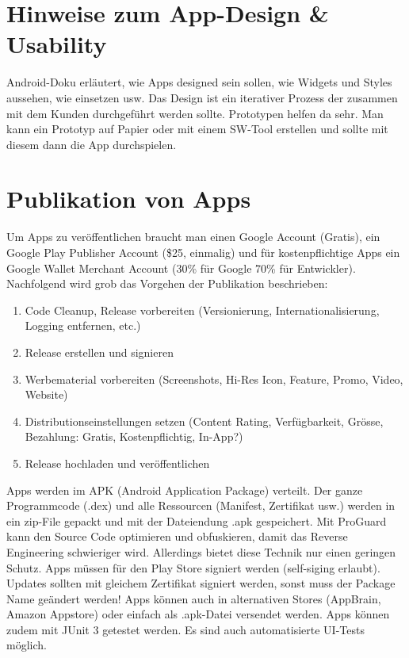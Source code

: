 \section{Hinweise zum App-Design \& Usability}

Android-Doku erläutert, wie Apps designed sein sollen, wie Widgets und Styles aussehen, wie einsetzen usw. Das Design ist ein iterativer Prozess der zusammen mit dem Kunden durchgeführt werden sollte. Prototypen helfen da sehr. Man kann ein Prototyp auf Papier oder mit einem SW-Tool erstellen und sollte mit diesem dann die App durchspielen. 

\section{Publikation von Apps}

Um Apps zu veröffentlichen braucht man einen Google Account (Gratis), ein Google Play Publisher Account (\$25, einmalig) und für kostenpflichtige Apps ein Google Wallet Merchant Account (30\% für Google 70\% für Entwickler). Nachfolgend wird grob das Vorgehen der Publikation beschrieben:
\begin{enumerate}
	\item Code Cleanup, Release vorbereiten (Versionierung, Internationalisierung, Logging entfernen, etc.)
	\item Release erstellen und signieren
	\item Werbematerial vorbereiten (Screenshots, Hi-Res Icon, Feature, Promo, Video, Website)
	\item Distributionseinstellungen setzen (Content Rating, Verfügbarkeit, Grösse, Bezahlung: Gratis, Kostenpflichtig, In-App?)
	\item Release hochladen und veröffentlichen
\end{enumerate}
Apps werden im APK (Android Application Package) verteilt. Der ganze Programmcode (.dex) und alle Ressourcen (Manifest, Zertifikat usw.) werden in ein zip-File gepackt und mit der Dateiendung .apk gespeichert.
Mit ProGuard kann den Source Code optimieren und obfuskieren, damit das Reverse Engineering schwieriger wird. Allerdings bietet diese Technik nur einen geringen Schutz.
Apps müssen für den Play Store signiert werden (self-siging erlaubt). Updates sollten mit gleichem Zertifikat signiert werden, sonst muss der Package Name geändert werden!
Apps können auch in alternativen Stores (AppBrain, Amazon Appstore) oder einfach als .apk-Datei versendet werden. Apps können zudem mit JUnit 3 getestet werden. Es sind auch automatisierte UI-Tests möglich.
